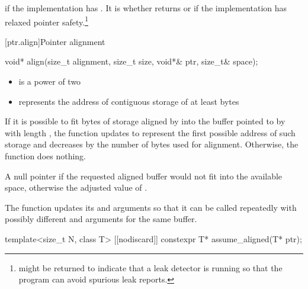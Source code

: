 \begin{itemdescr}
\pnum
\returns
{} if the implementation has
. It is
whether
 returns  or
 if the implementation has relaxed pointer
safety.\footnote{ might be returned to indicate
that a leak detector is running so that the program can avoid spurious leak
reports.}
\end{itemdescr}


[ptr.align]{Pointer alignment}

%
\begin{itemdecl}
void* align(size_t alignment, size_t size, void*& ptr, size_t& space);
\end{itemdecl}

\begin{itemdescr}
\pnum
\expects
\begin{itemize}
\item
{} is a power of two

\item
{} represents the address of contiguous storage of at least
 bytes
\end{itemize}

\pnum
\effects
If it is possible to fit  bytes
of storage aligned by  into the buffer pointed to by
 with length , the function updates
 to represent the first possible address of such storage
and decreases  by the number of bytes used for alignment.
Otherwise, the function does nothing.

\pnum
\returns
A null pointer if the requested aligned buffer
would not fit into the available space, otherwise the adjusted value
of .

\pnum
\begin{note}
The function updates its 
and  arguments so that it can be called repeatedly
with possibly different  and 
arguments for the same buffer.
\end{note}
\end{itemdescr}

%
\begin{itemdecl}
template<size_t N, class T>
  [[nodiscard]] constexpr T* assume_aligned(T* ptr);
\end{itemdecl}

